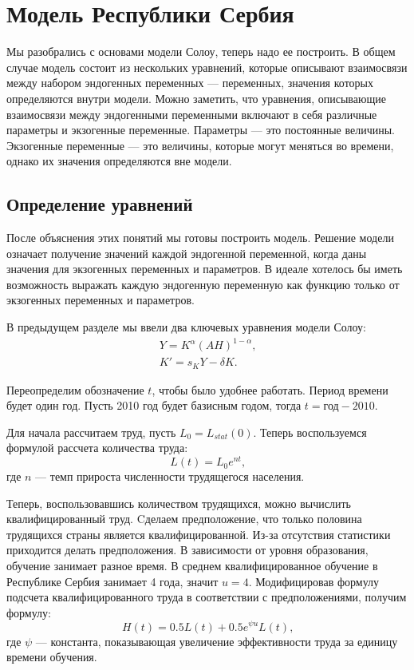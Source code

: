 \chapter{Модель Республики Сербия}

Мы разобрались с основами модели Солоу, теперь надо ее построить.
В общем случае модель состоит из нескольких уравнений, которые описывают взаимосвязи между набором эндогенных переменных --- переменных, значения которых определяются внутри модели.
Можно заметить, что уравнения, описывающие взаимосвязи между эндогенными переменными включают в себя различные параметры и экзогенные переменные.
Параметры --- это постоянные величины.
Экзогенные переменные --- это величины, которые могут меняться во времени, однако их значения определяются вне модели.

\section{Определение уравнений}

После объяснения этих понятий мы готовы построить модель.
Решение модели означает получение значений каждой эндогенной переменной, когда даны значения для экзогенных переменных и параметров.
В идеале хотелось бы иметь возможность выражать каждую эндогенную переменную как функцию только от экзогенных переменных и параметров.

В предыдущем разделе мы ввели два ключевых уравнения модели Солоу:
\begin{align*}
	Y=K^{\alpha}(AH)^{1-\alpha}\text{,}\\
	K'=s_{K}Y - \delta K \text{.}
\end{align*}

Переопределим обозначение $t$, чтобы было удобнее работать.
Период времени будет один год.
Пусть 2010 год будет базисным годом, тогда $t = \text{год} - 2010$.

Для начала рассчитаем труд, пусть $L_0 = L_{stat}(0)$.
Теперь воспользуемся формулой рассчета количества труда:
\begin{equation*}
	L(t) = L_0 e^{nt}\text{,}
\end{equation*}
где $n$ --- темп прироста численности трудящегося населения.

Теперь, воспользовавшись количеством трудящихся, можно вычислить квалифицированный труд.
Cделаем предположение, что только половина трудящихся страны является квалифицированной.
Из-за отсутствия статистики приходится делать предположения.
В зависимости от уровня образования, обучение занимает разное время.
В среднем квалифицированное обучение в Республике Сербия занимает 4 года, значит $u = 4$.
Модифицировав формулу подсчета квалифицированного труда в соответствии с предположениями, получим формулу:
\begin{equation*}
H(t) = 0.5L(t) + 0.5 e^{\psi u}L(t)\text{,}
\end{equation*}
где $\psi$ --- константа, показывающая увеличение эффективности труда за единицу времени обучения.

